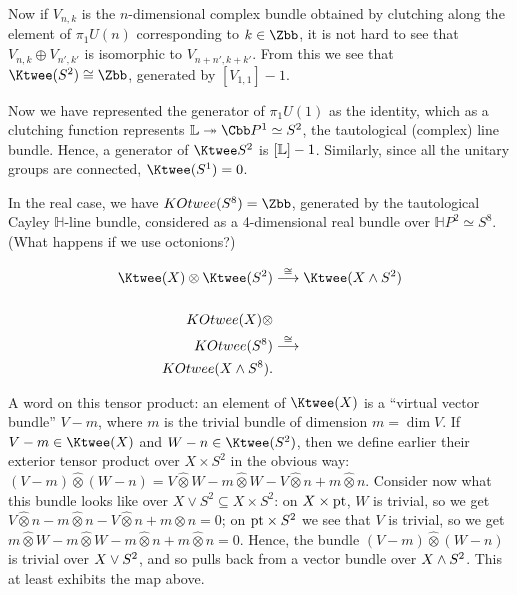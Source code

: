 Now if $V_{n,k}$ is the $n$-dimensional complex bundle obtained by clutching along the element of $\pi_1 U(n)$ corresponding to $k\in\Zbb$, it is not hard to see that $V_{n,k}\oplus V_{n',k'}$ is isomorphic to $V_{n+n',k+k'}$. From this we see that $\Ktwee(S^2) \cong \Zbb$, generated by $[V_{1,1}]-1$.

Now we have represented the generator of $\pi_1 U(1)$ as the identity, which as a clutching function represents $\bundle{L} \onto \CP^1 \simeq S^2$, the tautological (complex) line bundle.  Hence, a generator of $\Ktwee S^2$ is $[\mathbb{L}] - 1$.  Similarly, since all the unitary groups are connected, $\Ktwee(S^1) = 0$.

\begin{fact}
In the real case, we have $\\KOtwee(S^8) = \Zbb$, generated by the tautological Cayley $\mathbb{H}$-line bundle, considered as a 4-dimensional real bundle over $\mathbb{H}P^2 \simeq S^8$. (What happens if we use octonions?) %
\end{fact}

\begin{thm}
\begin{align*}
\Ktwee (X) \otimes \Ktwee (S^2) & \stackrel{\cong}{\to} \Ktwee(X \sprod S^2) \\
\\KOtwee (X) \otimes \\KOtwee (S^8) & \stackrel{\cong}{\to} \\KOtwee(X \sprod S^8).
\end{align*}
\end{thm}

A word on this tensor product: an element of $\Ktwee (X)$ is a ``virtual vector bundle'' $V - m$, where $m$ is the trivial bundle of dimension $m = \dim V$.  If $V - m \in \Ktwee(X)$ and $W - n \in \Ktwee(S^2)$, then we define earlier their exterior tensor product over $X \times S^2$ in the obvious way: $(V - m)\hat\otimes(W - n) = V \hat\otimes W - m \hat\otimes W - V \hat\otimes n + m \hat\otimes n$.  Consider now what this bundle looks like over $X \vee S^2 \subseteq X \times S^2$: on $X \times \mathrm{pt}$, $W$ is trivial, so we get $V \hat\otimes n - m \hat\otimes n - V \hat\otimes n + m \hat\otimes n = 0$; on $\mathrm{pt} \times S^2$ we see that $V$ is trivial, so we get $m \hat\otimes W - m \hat\otimes W - m \hat\otimes n + m \hat\otimes n = 0$.  Hence, the bundle $(V - m) \hat\otimes (W - n)$ is trivial over $X \vee S^2$, and so pulls back from a vector bundle over $X \wedge S^2$.  This at least exhibits the map above.

